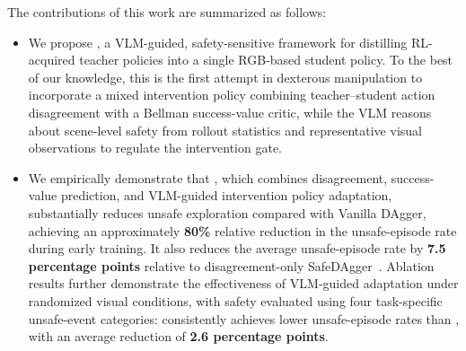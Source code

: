 The contributions of this work are summarized as follows:
\begin{itemize}
    \item We propose \methodname, a VLM-guided,
    safety-sensitive framework for
    distilling RL-acquired teacher policies into a single RGB-based student
    policy. To the best of our knowledge, this is the first attempt in dexterous manipulation to incorporate
    a mixed intervention policy combining teacher--student action disagreement
    with a Bellman success-value critic, while the VLM reasons about scene-level safety from rollout statistics and
    representative visual observations to regulate the intervention gate.

    \item We empirically demonstrate that \methodname, which combines
    disagreement, success-value prediction, and VLM-guided intervention policy adaptation,
    substantially reduces unsafe exploration compared with Vanilla DAgger,
    achieving an approximately \textbf{80\%} relative reduction in the
    unsafe-episode rate during early training. It also reduces the average
    unsafe-episode rate by \textbf{7.5 percentage points} relative to
    disagreement-only SafeDAgger~\cite{zhang2016query}. Ablation results further demonstrate the
    effectiveness of VLM-guided adaptation under randomized visual conditions,
    with safety evaluated using four task-specific unsafe-event categories:
    \methodname consistently achieves lower unsafe-episode
    rates than \dexsafedagger, with an average reduction of
    \textbf{2.6 percentage points}.
\end{itemize}
